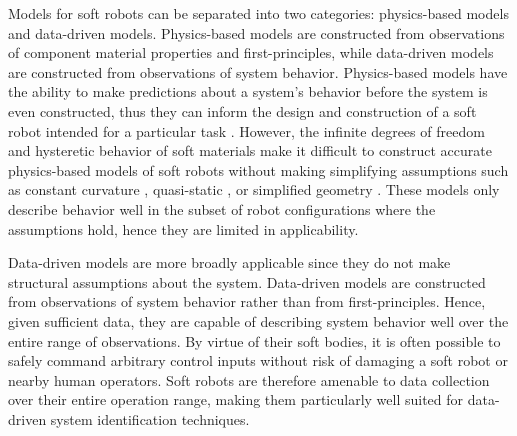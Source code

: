 Models for soft robots can be separated into two categories: physics-based models and data-driven models.
Physics-based models are constructed from observations of component material properties and first-principles, while data-driven models are constructed from observations of system behavior.
Physics-based models have the ability to make predictions about a system's behavior before the system is even constructed,
thus they can inform the design and construction of a soft robot intended for a particular task \cite{bishop2015design, bruder2018iros} .
However, the infinite degrees of freedom and hysteretic behavior of soft materials make it difficult to construct accurate physics-based models of soft robots without making simplifying assumptions such as constant curvature \cite{rus2015design}, quasi-static \cite{george2018control}, or simplified geometry \cite{bruder2017model, sedal2017constitutive, bishop2012parallel} .
These models only describe behavior well in the subset of robot configurations where the assumptions hold, hence they are limited in applicability.

Data-driven models are more broadly applicable since they do not make structural assumptions about the system.
Data-driven models are constructed from observations of system behavior rather than from first-principles.
Hence, given sufficient data, they are capable of describing system behavior well over the entire range of observations.
By virtue of their soft bodies, it is often possible to safely command arbitrary control inputs without risk of damaging a soft robot or nearby human operators.
Soft robots are therefore amenable to data collection over their entire operation range, making them particularly well suited for data-driven system identification techniques.


